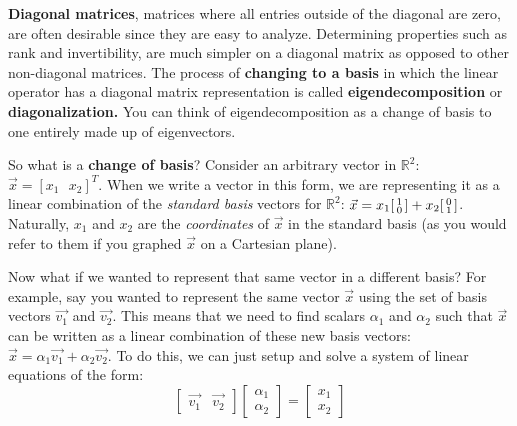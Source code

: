 


\textbf{Diagonal matrices}, matrices where all entries outside of the diagonal are zero, are often desirable since they are easy to analyze. 
Determining properties such as rank and invertibility, are much simpler on a diagonal matrix as opposed to other non-diagonal matrices.
The process of \textbf{changing to a basis} in which the linear operator has a diagonal matrix representation is called \textbf{eigendecomposition} or \textbf{diagonalization.} You can think of eigendecomposition as a change of basis to one entirely made up of eigenvectors.

So what is a \textbf{change of basis}? Consider an arbitrary vector in $\mathbb{R}^2$: $\vec{x} = [ x_1 \text{ } x_2 ]^T$.
When we write a vector in this form, we are representing it as a linear combination of the \textit{standard basis} vectors for $\mathbb{R}^2$: $\vec{x} = x_1 \begin{bsmallmatrix} 1 \\ 0 \end{bsmallmatrix} + x_2 \begin{bsmallmatrix} 0 \\ 1 \end{bsmallmatrix}$. Naturally, $x_1$ and $x_2$ are the \textit{coordinates} of $\vec{x}$ in the standard basis (as you would refer to them if you graphed $\vec{x}$ on a Cartesian plane).

Now what if we wanted to represent that same vector in a different basis? 
For example, say you wanted to represent the same vector $\vec{x}$ using the set of basis vectors $\vec{v_1}$ and $\vec{v_2}$.
This means that we need to find scalars $\alpha_1$ and $\alpha_2$ such that $\vec{x}$ can be written as a linear combination of these new basis vectors: $\vec{x} = \alpha_1 \vec{v_1} + \alpha_2 \vec{v_2}$.
To do this, we can just setup and solve a system of linear equations of the form:
$$\begin{bmatrix} \vec{v_1} & \vec{v_2} \end{bmatrix} \begin{bmatrix} \alpha_1 \\ \alpha_2 \end{bmatrix} = \begin{bmatrix} x_1 \\ x_2 \end{bmatrix}$$

